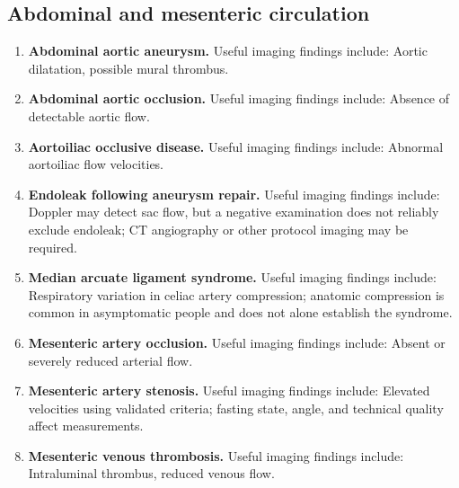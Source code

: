 \subsection{Abdominal and mesenteric circulation}
\begin{enumerate}[leftmargin=*,itemsep=0.45em,topsep=0.4em]
\item \textbf{Abdominal aortic aneurysm.} Useful imaging findings include: Aortic dilatation, possible mural thrombus.
\item \textbf{Abdominal aortic occlusion.} Useful imaging findings include: Absence of detectable aortic flow.
\item \textbf{Aortoiliac occlusive disease.} Useful imaging findings include: Abnormal aortoiliac flow velocities.
\item \textbf{Endoleak following aneurysm repair.} Useful imaging findings include: Doppler may detect sac flow, but a negative examination does not reliably exclude endoleak; CT angiography or other protocol imaging may be required.
\item \textbf{Median arcuate ligament syndrome.} Useful imaging findings include: Respiratory variation in celiac artery compression; anatomic compression is common in asymptomatic people and does not alone establish the syndrome.
\item \textbf{Mesenteric artery occlusion.} Useful imaging findings include: Absent or severely reduced arterial flow.
\item \textbf{Mesenteric artery stenosis.} Useful imaging findings include: Elevated velocities using validated criteria; fasting state, angle, and technical quality affect measurements.
\item \textbf{Mesenteric venous thrombosis.} Useful imaging findings include: Intraluminal thrombus, reduced venous flow.
\end{enumerate}


